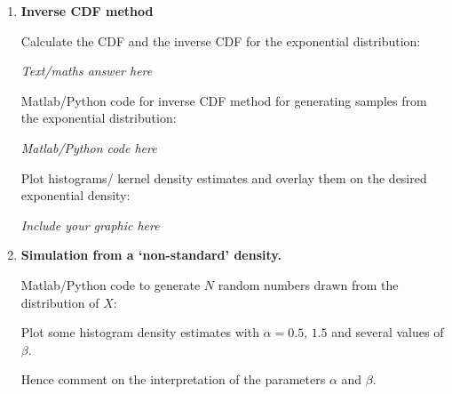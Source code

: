 \documentclass[12pt]{article}
\begin{document}
\begin{enumerate}
{\em Include your graphic here}
\vspace{3in}


\item{\bf Inverse CDF method} 



Calculate the CDF and the inverse CDF for the exponential distribution: 


{\em Text/maths answer  here}
\vspace{3in}



Matlab/Python code for inverse CDF method for generating samples from the exponential distribution:


{\em Matlab/Python code  here}
\vspace{3in}



Plot histograms/ kernel density estimates and overlay them on the desired exponential density:


{\em Include your graphic here}
\vspace{3in}

\item {\bf Simulation from a `non-standard'  density.}

Matlab/Python code to generate $N$ random numbers drawn from the distribution of $X$:
\vspace{3in}

Plot some histogram density estimates with $\alpha=0.5,\,1.5$ and several values of $\beta$. 

\vspace{3in}

Hence comment on the interpretation of the parameters $\alpha$ and $\beta$.


\end{enumerate}
\end{document}
